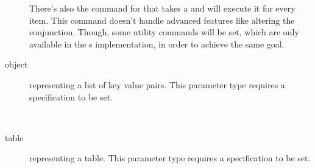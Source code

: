 \documentclass{ltxdoc}
\newcommand\showexample[5][15pt]{%
\begin{minipage}[t]{.5\linewidth - .5 \columnsep}%

\end{minipage}\hspace*{\columnsep}%
\begin{minipage}[t]{.5\linewidth - .5 \columnsep}%

\end{minipage}\\%
}
\begin{document}
\begin{description}
        \DescribeMacro{\forcsparamlist}
        There's also the \cmd{\forcsparamlist} command for that takes a  and will execute it for every item.
        This command doesn't handle advanced features like altering the conjunction.
        Though, some utility commands will be set, which are only available in the s implementation, in order to achieve the same goal.
        \item[object] representing a list of key value pairs.
        This parameter type requires a  specification to be set.\\
        \showexample{16}{16-24}{7}{7-9}
        \item[table] representing a table.
        This parameter type requires a  specification to be set.\\
        \showexample[20pt]{25}{25}{10}{10}
    \end{description}

%    
%
%    
\end{document}
